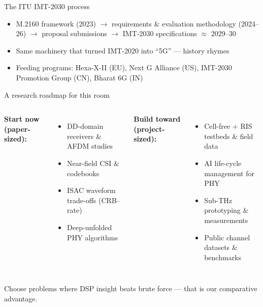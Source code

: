 \begin{frame}{The ITU IMT-2030 process}
  \begin{itemize}\itemsep2pt
    \item M.2160 framework (2023) $\to$ requirements \& evaluation
          methodology (2024--26) $\to$ proposal submissions $\to$
          IMT-2030 specifications $\approx$ 2029--30
    \item Same machinery that turned IMT-2020 into ``5G'' --- history rhymes
    \item Feeding programs: Hexa-X-II (EU), Next G Alliance (US), IMT-2030
          Promotion Group (CN), Bharat 6G (IN)
  \end{itemize}
\end{frame}

\begin{frame}{A research roadmap for this room}
  \begin{columns}[T]
    \textbf{Start now (paper-sized):}
    \begin{itemize}\itemsep1pt
      \item DD-domain receivers \& AFDM studies
      \item Near-field CSI \& codebooks
      \item ISAC waveform trade-offs (CRB--rate)
      \item Deep-unfolded PHY algorithms
    \end{itemize}
    \textbf{Build toward (project-sized):}
    \begin{itemize}\itemsep1pt
      \item Cell-free + RIS testbeds \& field data
      \item AI life-cycle management for PHY
      \item Sub-THz prototyping \& measurements
      \item Public channel datasets \& benchmarks
    \end{itemize}
  \end{columns}
  \vspace{2mm}
  \centering Choose problems where \alert{DSP insight beats brute force} ---
  that is our comparative advantage.
\end{frame}

